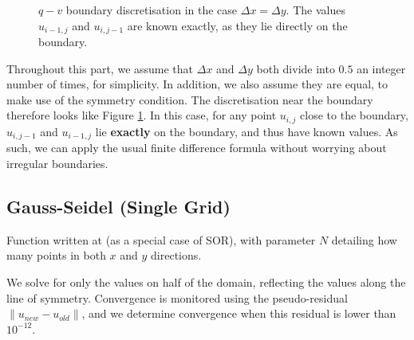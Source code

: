 \documentclass{article}
\numberwithin{equation}{section}
\theoremstyle{definition}
\begin{document}
\begin{figure}[H]
    \centering
    \caption{$q-v$ boundary discretisation in the case $\Delta x = \Delta y$. The values $u_{i-1,j}$ and $u_{i,j-1}$ are known exactly, as they lie directly on the boundary.}
    \label{fig:grid2}
\end{figure}
Throughout this part, we assume that $\Delta x$ and $\Delta y$ both divide into $0.5$ an integer number of times, for simplicity. In addition, we also assume they are equal, to make use of the symmetry condition. The discretisation near the boundary therefore looks like Figure \ref{fig:grid2}. In this case, for any point $u_{i,j}$ close to the boundary, $u_{i,j-1}$ and $u_{i-1,j}$ lie \textbf{exactly} on the boundary, and thus have known values. As such, we can apply the usual finite difference formula without worrying about irregular boundaries.

\subsection{Gauss-Seidel (Single Grid)}
Function written at  (as a special case of SOR), with parameter $N$ detailing how many points in both $x$ and $y$ directions.

We solve for only the values on half of the domain, reflecting the values along the line of symmetry. Convergence is monitored using the pseudo-residual $\|u_{new} - u_{old}\|$, and we determine convergence when this residual is lower than $10^{-12}$.
\end{document}
